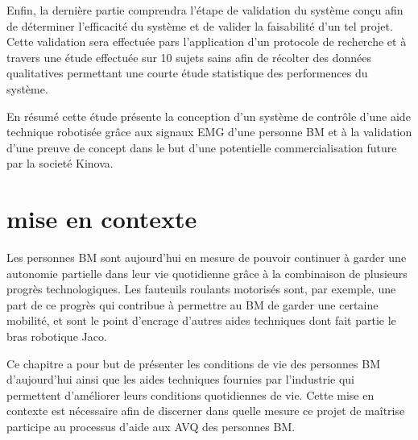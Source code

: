 \documentclass[letterpaper, twoside, 12pt, memoire, creativecommons, hyperref]{thETS}
\begin{document}
\begin{introduction}
Enfin, la dernière partie comprendra l'étape de validation du système conçu afin de déterminer l'efficacité du système et de valider la faisabilité d'un tel projet. Cette validation sera effectuée pars l'application d'un protocole de recherche et à travers une étude effectuée sur 10 sujets sains afin de récolter des données qualitatives permettant une courte étude statistique des performences du système.

En résumé cette étude présente la conception d'un système de contrôle d'une aide technique robotisée grâce aux signaux EMG d'une personne BM et à la validation d'une preuve de concept dans le but d'une potentielle commercialisation future par la societé Kinova.

%



\end{introduction}

%
%

\chapter{mise en contexte}\label{CHmiseencontexte}

Les personnes BM sont aujourd'hui en mesure de pouvoir continuer à garder une autonomie partielle dans leur vie quotidienne grâce à la combinaison de plusieurs progrès technologiques. Les fauteuils roulants motorisés sont, par exemple, une part de ce progrès qui contribue à permettre au BM de garder une certaine mobilité, et sont le point d'encrage d'autres aides techniques dont fait partie le bras robotique Jaco.

Ce chapitre a pour but de présenter les conditions de vie des personnes BM d'aujourd'hui ainsi que les aides techniques fournies par l'industrie qui permettent d'améliorer leurs conditions quotidiennes de vie. Cette mise en contexte est nécessaire afin de discerner dans quelle mesure ce projet de maîtrise participe au processus d'aide aux AVQ des personnes BM.
\end{document}
